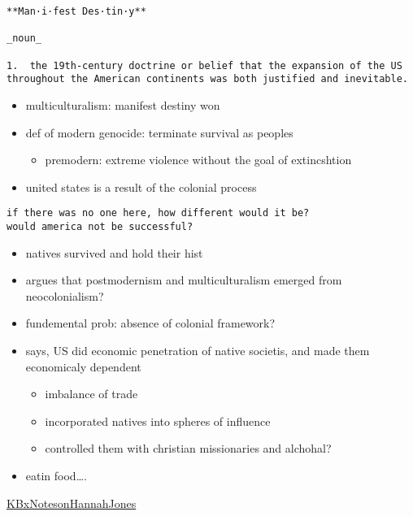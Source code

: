 \documentclass[letterpaper]{article}
\begin{document}
\begin{verbatim}
**Man·i·fest Des·tin·y**

_noun_

1.  the 19th-century doctrine or belief that the expansion of the US throughout the American continents was both justified and inevitable.
\end{verbatim}

\begin{itemize}
\item multiculturalism: manifest destiny won
\item def of modern genocide: terminate survival as peoples

\begin{itemize}
\item premodern: extreme violence without the goal of extincshtion
\end{itemize}

\item united states is a result of the colonial process
\end{itemize}

\begin{verbatim}
if there was no one here, how different would it be?
would america not be successful?
\end{verbatim}

\begin{itemize}
\item natives survived and hold their hist
\item argues that postmodernism and multiculturalism emerged from
neocolonialism?
\item fundemental prob: absence of colonial framework?
\item says, US did economic penetration of native societis, and made them
economicaly dependent

\begin{itemize}
\item imbalance of trade
\item incorporated natives into spheres of influence
\item controlled them with christian missionaries and alchohal?
\end{itemize}

\item eatin food\ldots{}.
\end{itemize}

\href{KBxNotesonHannahJones.org}{KBxNotesonHannahJones}
\end{document}
